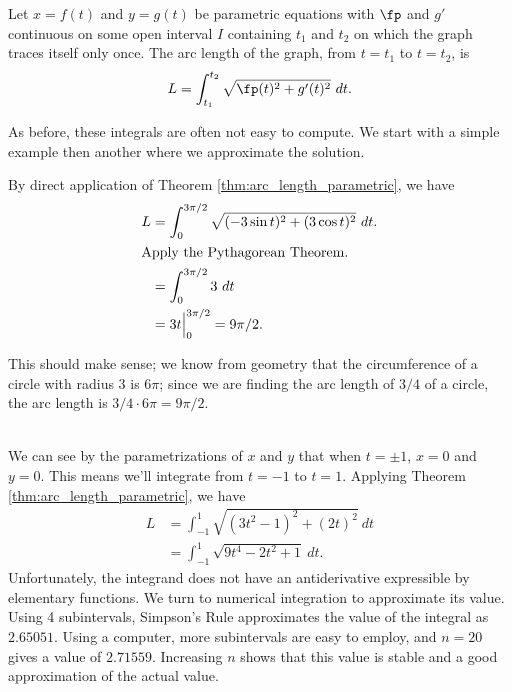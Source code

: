{Let $x=f(t)$ and $y=g(t)$ be parametric equations with $\fp$ and $g'$ continuous on some open interval $I$ containing $t_1$ and $t_2$ on which the graph traces itself only once. The arc length of the graph, from $t=t_1$ to $t=t_2$, is
$$L = \int_{t_1}^{t_2} \sqrt{\fp(t)^2+g'(t)^2}\ dt.$$
}

As before, these integrals are often not easy to compute. We start with a simple example then another where we approximate the solution.\\

{By direct application of Theorem \ref{thm:arc_length_parametric}, we have
\begin{align*}
L &= \int_0^{3\pi/2} \sqrt{(-3\sin t)^2 +(3\cos t)^2} \ dt.\\
\intertext{Apply the Pythagorean Theorem.}
	&= \int_0^{3\pi/2} 3 \ dt\\
	&= 3t\Big|_0^{3\pi/2} = 9\pi/2.
	\end{align*}
	
This should make sense; we know from geometry that the circumference of a circle with radius 3 is $6\pi$; since we are finding the arc length of $3/4$ of a circle, the arc length is $3/4\cdot 6\pi = 9\pi/2$.
}\\

{We can see by the parametrizations of $x$ and $y$ that when $t=\pm 1$, $x=0$ and $y=0$. This means we'll integrate from $t=-1$ to $t=1$. Applying Theorem \ref{thm:arc_length_parametric}, we have
\begin{align*}
L 	&= \int_{-1}^1\sqrt{(3t^2-1)^2+(2t)^2}\ dt\\
		&=	\int_{-1}^1 \sqrt{9t^4-2t^2+1} \ dt.
\end{align*}
Unfortunately, the integrand does not have an antiderivative expressible by elementary functions. We turn to numerical integration to approximate its value. Using 4 subintervals, Simpson's Rule approximates the value of the integral as $2.65051$. Using a computer, more subintervals are easy to employ, and $n=20$ gives a value of $2.71559$. Increasing $n$ shows that this value is stable and a good approximation of the actual value.
}\\

